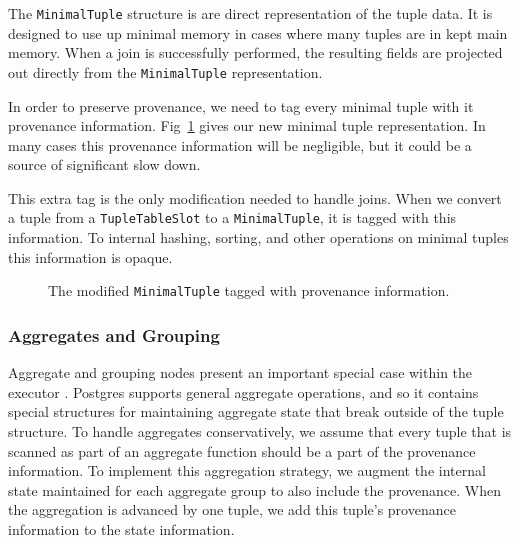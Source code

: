 The \texttt{MinimalTuple} structure is are direct representation of the tuple data. It is designed to use up minimal memory in cases where many tuples are in kept main memory. When a join is successfully performed, the resulting fields are projected out directly from the \texttt{MinimalTuple} representation. 

In order to preserve provenance, we need to tag every minimal tuple with it provenance information. Fig~\ref{mintup} gives our new minimal tuple representation. In many cases this provenance information will be negligible, but it could be a source of significant slow down. 

This extra tag is the only modification needed to handle joins. When we convert a tuple from a \texttt{TupleTableSlot} to a \texttt{MinimalTuple}, it is tagged with this information. To internal hashing, sorting, and other operations on minimal tuples this information is opaque.   

\begin{figure}
  \centering
  
  \caption {The modified \texttt{MinimalTuple} tagged with provenance information.}
  \label{mintup}
\end{figure}





\subsubsection{Aggregates and Grouping}

Aggregate and grouping nodes present an important special case within the executor . Postgres supports general aggregate operations, and so it contains special structures for maintaining aggregate state that break outside of the tuple structure. To handle aggregates conservatively, we assume that every tuple that is scanned as part of an aggregate function should be a part of the provenance information. To implement this aggregation strategy, we augment the internal state maintained for each aggregate group to also include the provenance. When the aggregation is advanced by one tuple, we add this tuple's provenance information to the state information. 


